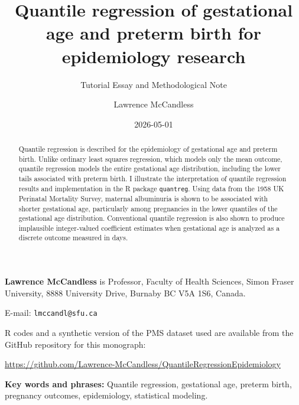 \documentclass[
  letterpaper,
  DIV=11,
  numbers=noendperiod]{scrartcl}
\title{Quantile regression of gestational age and preterm birth for
epidemiology research}
\subtitle{Tutorial Essay and Methodological Note}
\author{Lawrence McCandless}
\date{2026-05-01}
\renewcommand*\contentsname{Table of contents}
\newcommand\contentsname{Table of contents}
\begin{document}
\maketitle
\begin{abstract}
Quantile regression is described for the epidemiology of gestational age
and preterm birth. Unlike ordinary least squares regression, which
models only the mean outcome, quantile regression models the entire
gestational age distribution, including the lower tails associated with
preterm birth. I illustrate the interpretation of quantile regression
results and implementation in the R package \texttt{quantreg}. Using
data from the 1958 UK Perinatal Mortality Survey, maternal albuminuria
is shown to be associated with shorter gestational age, particularly
among pregnancies in the lower quantiles of the gestational age
distribution. Conventional quantile regression is also shown to produce
implausible integer-valued coefficient estimates when gestational age is
analyzed as a discrete outcome measured in days.
\end{abstract}

\renewcommand*\contentsname{Table of contents}
{
\setcounter{tocdepth}{3}
\tableofcontents
}

\begin{tcolorbox}[enhanced jigsaw, arc=.35mm, bottomrule=.15mm, breakable, colback=white, colframe=quarto-callout-note-color-frame, left=2mm, leftrule=.75mm, opacityback=0, rightrule=.15mm, toprule=.15mm]
\begin{minipage}[t]{5.5mm}
\textcolor{quarto-callout-note-color}{\faInfo}
\end{minipage}%
\begin{minipage}[t]{\textwidth - 5.5mm}

\textbf{Lawrence McCandless} is Professor, Faculty of Health Sciences,
Simon Fraser University, 8888 University Drive, Burnaby BC V5A 1S6,
Canada.

E-mail: \texttt{lmccandl@sfu.ca}

R codes and a synthetic version of the PMS dataset used are available
from the GitHub repository for this monograph:

\url{https://github.com/Lawrence-McCandless/QuantileRegressionEpidemiology}

\end{minipage}%
\end{tcolorbox}

\textbf{Key words and phrases:} Quantile regression, gestational age,
preterm birth, pregnancy outcomes, epidemiology, statistical modeling.
\end{document}
